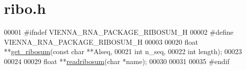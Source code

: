 \hypertarget{ribo_8h_source}{}\section{ribo.\+h}
\label{ribo_8h_source}

\begin{DoxyCode}
00001 \textcolor{preprocessor}{#ifndef VIENNA\_RNA\_PACKAGE\_RIBOSUM\_H}
00002 \textcolor{preprocessor}{#define VIENNA\_RNA\_PACKAGE\_RIBOSUM\_H}
00003 
00020 \textcolor{keywordtype}{float} **\hyperlink{group__file__utils_ga1116aed4b2dab5252cd23946d47d52c3}{get\_ribosum}(\textcolor{keyword}{const} \textcolor{keywordtype}{char}  **Alseq,
00021                     \textcolor{keywordtype}{int}         n\_seq,
00022                     \textcolor{keywordtype}{int}         length);
00023 
00024 
00029 \textcolor{keywordtype}{float} **\hyperlink{group__file__utils_ga5e125c9586fcd4e2e1559fe76f7289cc}{readribosum}(\textcolor{keywordtype}{char} *name);
00030 
00031 
00035 \textcolor{preprocessor}{#endif}
\end{DoxyCode}
